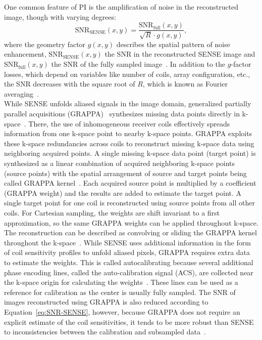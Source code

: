 One common feature of PI is the amplification of noise in the reconstructed image, though with varying degrees:
\begin{equation} \label{eq:SNR-SENSE}
	\text{SNR}_{\text{SENSE}}(x,y) = \frac{\text{SNR}_{\text{full}}(x,y)}{\sqrt{R} \cdot g(x,y)},
\end{equation}
where the geometry factor $g(x,y)$ describes the spatial pattern of noise enhancement, $\text{SNR}_{\text{SENSE}}(x,y)$ the SNR in the reconstructed SENSE image and $\text{SNR}_{\text{full}}(x,y)$ the SNR of the fully sampled image~\cite{AdvancesPI}. In addition to the $g$-factor losses, which depend on variables like number of coils, array configuration, etc., the SNR decreases with the square root of $R$, which is known as Fourier averaging~\cite{AdvancesPI}.\\
While SENSE unfolds aliased signals in the image domain, generalized partially parallel acquisitions (GRAPPA)~\cite{GRAPPA} synthesizes missing data points directly in k-space~\cite{ParallelMRI}. There, the use of inhomogeneous receiver coils effectively spreads information from one k-space point to nearby k-space points. GRAPPA exploits these k-space redundancies across coils to reconstruct missing k-space data using neighboring acquired points. A single missing k-space data point (target point) is synthesized as a linear combination of acquired neighboring k-space points (source points) with the spatial arrangement of source and target points being called GRAPPA kernel~\cite{ParallelMRI}. Each acquired source point is multiplied by a coefficient (GRAPPA weight) and the results are added to estimate the target point. A single target point for one coil is reconstructed using source points from all other coils. For Cartesian sampling, the weights are shift invariant to a first approximation, so the same GRAPPA weights can be applied throughout k-space. The reconstruction can be described as convolving or sliding the GRAPPA kernel throughout the k-space~\cite{AdvancesPI}. While SENSE uses additional information in the form of coil sensitivity profiles to unfold aliased pixels, GRAPPA requires extra data to estimate the weights. This is called autocalibrating because several additional phase encoding lines, called the auto-calibration signal (ACS), are collected near the k-space origin for calculating the weights~\cite{ParallelMRI}. These lines can be used as a reference for calibration as the center is usually fully sampled. The SNR of images reconstructed using GRAPPA is also reduced according to Equation~\ref{eq:SNR-SENSE}, however, because GRAPPA does not require an explicit estimate of the coil sensitivities, it tends to be more robust than SENSE to inconsistencies between the calibration and subsampled data~\cite{AdvancesPI}.\\
